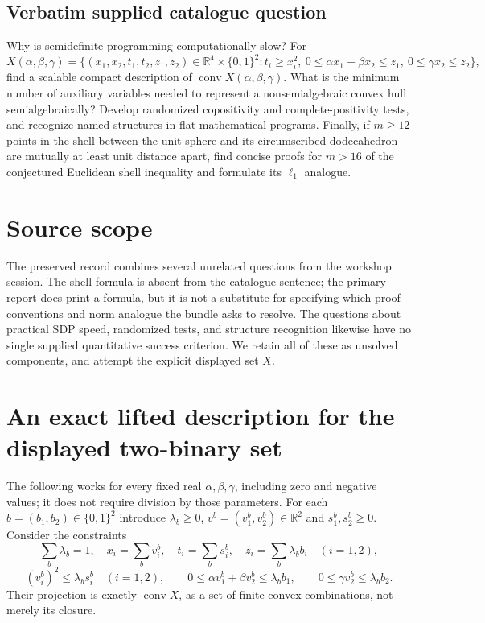 \documentclass[11pt]{article}
\begin{document}
\subsection{Verbatim supplied catalogue question}
Why is semidefinite programming computationally slow? For
$$X(\alpha,\beta,\gamma)=\{(x_1,x_2,t_1,t_2,z_1,z_2)\in\mathbb R^4\times\{0,1\}^2:t_i\geq x_i^2,\ 0\leq\alpha x_1+\beta x_2\leq z_1,\ 0\leq\gamma x_2\leq z_2\},$$
find a scalable compact description of $\operatorname{conv}X(\alpha,\beta,\gamma)$. What is the minimum number of auxiliary variables needed to represent a nonsemialgebraic convex hull semialgebraically? Develop randomized copositivity and complete-positivity tests, and recognize named structures in flat mathematical programs. Finally, if $m\geq12$ points in the shell between the unit sphere and its circumscribed dodecahedron are mutually at least unit distance apart, find concise proofs for $m>16$ of the conjectured Euclidean shell inequality and formulate its $\ell_1$ analogue.

\section{Source scope}
The preserved record combines several unrelated questions from the workshop
session. The shell formula is absent from the catalogue sentence; the primary
report does print a formula, but it is not a substitute for specifying which
proof conventions and norm analogue the bundle asks to resolve. The questions
about practical SDP speed, randomized tests, and structure recognition likewise
have no single supplied quantitative success criterion. We retain all of these
as unsolved components, and attempt the explicit displayed set $X$.

\section{An exact lifted description for the displayed two-binary set}
The following works for every fixed real $\alpha,\beta,\gamma$, including
zero and negative values; it does not require division by those parameters.
For each $b=(b_1,b_2)\in\{0,1\}^2$ introduce $\lambda_b\ge0$,
$v^b=(v^b_1,v^b_2)\in\mathbb R^2$ and $s^b_1,s^b_2\ge0$.
Consider the constraints
\[
\sum_b\lambda_b=1,\quad
x_i=\sum_bv^b_i,\quad t_i=\sum_bs^b_i,\quad
z_i=\sum_b\lambda_b b_i\quad(i=1,2),
\]
\[
(v^b_i)^2\le\lambda_b s^b_i\quad(i=1,2),\qquad
0\le\alpha v^b_1+\beta v^b_2\le\lambda_b b_1,\qquad
0\le\gamma v^b_2\le\lambda_b b_2.
\]
Their projection is exactly $\operatorname{conv}X$, as a set of finite convex
combinations, not merely its closure.
\end{document}
